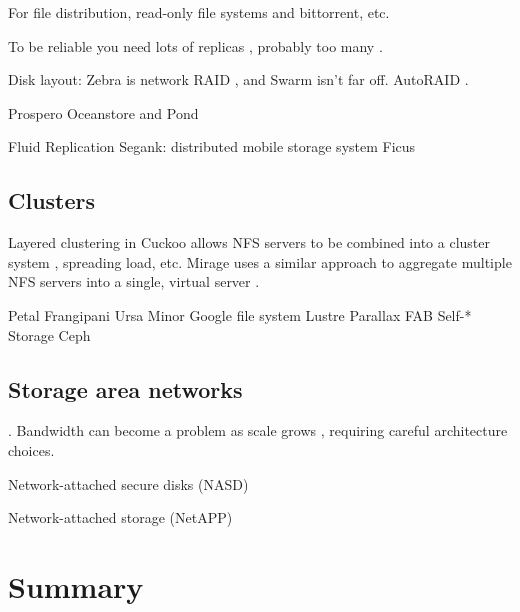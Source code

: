 For file distribution, read-only file systems \cite{fu} and bittorrent, etc.

To be reliable you need lots of replicas \cite{rabin}, probably too many \cite{blake}.

Disk layout:
Zebra \cite{hartman93} is network RAID \cite{patterson}, and Swarm \cite{hartman99} isn't far off. AutoRAID \cite{wilkes95}.

Prospero \cite{neuman}
Oceanstore and Pond \cite{kubiatowicz,rhea}

Fluid Replication \cite{kim}
Segank: distributed mobile storage system \cite{sobti}
Ficus \cite{popek}



\subsection{Clusters}

\cite{amiri}

Layered clustering in Cuckoo allows NFS servers to be combined into a cluster system \cite{klosterman}, spreading load, etc. Mirage uses a similar approach to aggregate multiple NFS servers into a single, virtual server \cite{baker02}.

Petal \cite{lee95,lee96}
Frangipani \cite{thekkath}
Ursa Minor \cite{abd-el-malek}
Google file system \cite{ghemawat}
Lustre \cite{lustre}
Parallax \cite{warfield}
FAB \cite{frolund,saito04,ji}
Self-* Storage \cite{ganger03}
Ceph \cite{weil}

\subsection{Storage area networks}
\cite{burns}. Bandwidth can become a problem as scale grows \cite{hospodor}, requiring careful architecture choices.

Network-attached secure disks (NASD) \cite{gibson97,gibson98a}

Network-attached storage (NetAPP) \cite{hitz}

\section{Summary}
